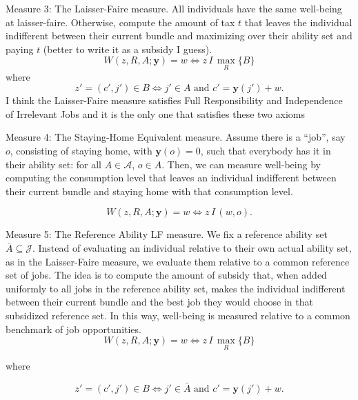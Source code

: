 Measure 3: The Laisser-Faire measure. All individuals have the same well-being at laisser-faire. Otherwise, compute the amount of tax $t$ that leaves the individual indifferent between their current bundle and maximizing over their ability set and paying $t$ (better to write it as a subsidy I guess).
\begin{equation*}
\label{ }
W(z, R, A;\mathbf{y})=w\Leftrightarrow z\,I\,\max_R\{B\}
\end{equation*}
where 
\begin{equation*}
\label{ }
z'=(c',j')\in B\Leftrightarrow j'\in A \textrm{ and } c'=\mathbf{y}(j')+w.
\end{equation*}
I think the Laisser-Faire measure satisfies Full Responsibility and Independence of Irrelevant Jobs and it is the only one that satisfies these two axioms

Measure 4: The Staying-Home Equivalent measure. Assume there is a ``job'', say $o$, consisting of staying home, with $\mathbf{y}(o)=0$, such that everybody has it in their ability set: for all $A\in\mathcal{A}$, $o\in A$. Then, we can measure well-being by computing the consumption level that leaves an individual indifferent between their current bundle and staying home with that consumption level.

\begin{equation*}
\label{ }
W(z, R, A;\mathbf{y})=w\Leftrightarrow z\,I\,(w,o).
\end{equation*}


Measure 5: The Reference Ability LF measure. We fix a reference ability set $\bar{A}\subseteq \mathcal{J}$. Instead of evaluating an individual relative to their own actual ability set, as in the Laisser-Faire measure, we evaluate them relative to a common reference set of jobs. The idea is to compute the amount of subsidy that, when added uniformly to all jobs in the reference ability set, makes the individual indifferent between their current bundle and the best job they would choose in that subsidized reference set. In this way, well-being is measured relative to a common benchmark of job opportunities. 
\begin{equation*}
W(z,R,A;\mathbf{y})=w
\Leftrightarrow
z\,I\,\max_R\{B\}
\end{equation*}

where

\begin{equation*}
z'=(c',j')\in B
\Leftrightarrow
j'\in \bar{A}
\textrm{ and }
c'=\mathbf{y}(j')+w.
\end{equation*}

